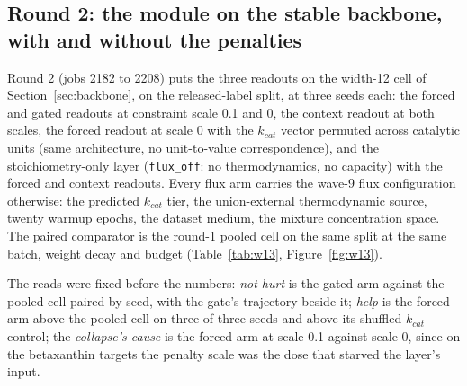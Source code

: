 

\subsection{Round 2: the module on the stable backbone, with and without the penalties}

Round 2 (jobs 2182 to 2208) puts the three readouts on the width-12 cell of
Section~\ref{sec:backbone}, on the released-label split, at three seeds each: the forced
and gated readouts at constraint scale 0.1 and 0, the context readout at both scales, the
forced readout at scale 0 with the $k_{cat}$ vector permuted across catalytic units (same
architecture, no unit-to-value correspondence), and the stoichiometry-only layer
(\texttt{flux\_off}: no thermodynamics, no capacity) with the forced and context readouts.
Every flux arm carries the wave-9 flux configuration otherwise: the predicted $k_{cat}$
tier, the union-external thermodynamic source, twenty warmup epochs, the dataset medium,
the mixture concentration space. The paired comparator is the round-1 pooled cell on the
same split at the same batch, weight decay and budget (Table~\ref{tab:w13},
Figure~\ref{fig:w13}).

The reads were fixed before the numbers: \emph{not hurt} is the gated arm against the
pooled cell paired by seed, with the gate's trajectory beside it; \emph{help} is the forced
arm above the pooled cell on three of three seeds and above its shuffled-$k_{cat}$ control;
the \emph{collapse's cause} is the forced arm at scale 0.1 against scale 0, since on the
betaxanthin targets the penalty scale was the dose that starved the layer's input.




